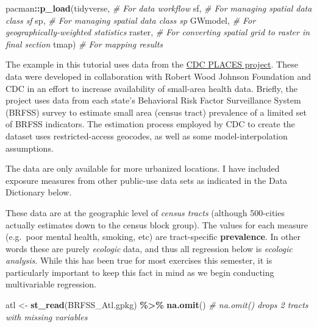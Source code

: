 \documentclass[
]{book}
\newenvironment{Shaded}{\begin{snugshade}}{\end{snugshade}}
\newcommand{\CommentTok}[1]{\textcolor[rgb]{0.56,0.35,0.01}{\textit{#1}}}
\newcommand{\FunctionTok}[1]{\textcolor[rgb]{0.13,0.29,0.53}{\textbf{#1}}}
\newcommand{\NormalTok}[1]{#1}
\newcommand{\OtherTok}[1]{\textcolor[rgb]{0.56,0.35,0.01}{#1}}
\newcommand{\SpecialCharTok}[1]{\textcolor[rgb]{0.81,0.36,0.00}{\textbf{#1}}}
\newcommand{\StringTok}[1]{\textcolor[rgb]{0.31,0.60,0.02}{#1}}
\begin{document}
\begin{Shaded}
\begin{Highlighting}[]
\NormalTok{pacman}\SpecialCharTok{::}\FunctionTok{p\_load}\NormalTok{(tidyverse,   }\CommentTok{\# For data workflow}
\NormalTok{               sf,          }\CommentTok{\# For managing spatial data class sf}
\NormalTok{               sp,          }\CommentTok{\# For managing spatial data class sp}
\NormalTok{               GWmodel,     }\CommentTok{\# For geographically{-}weighted statistics}
\NormalTok{               raster,      }\CommentTok{\# For converting spatial grid to raster in final section}
\NormalTok{               tmap)        }\CommentTok{\# For mapping results}
\end{Highlighting}
\end{Shaded}

The example in this tutorial uses data from the \href{https://www.cdc.gov/places/index.html}{CDC PLACES project}. These data were developed in collaboration with Robert Wood Johnson Foundation and CDC in an effort to increase availability of small-area health data. Briefly, the project uses data from each state's Behavioral Risk Factor Surveillance System (BRFSS) survey to estimate small area (census tract) prevalence of a limited set of BRFSS indicators. The estimation process employed by CDC to create the dataset uses restricted-access geocodes, as well as some model-interpolation assumptions.

The data are only available for more urbanized locations. I have included exposure measures from other public-use data sets as indicated in the Data Dictionary below.

These data are at the geographic level of \emph{census tracts} (although 500-cities actually estimates down to the census block group). The values for each measure (e.g.~poor mental health, smoking, etc) are tract-specific \textbf{prevalence}. In other words these are purely \emph{ecologic} data, and thus all regression below is \emph{ecologic analysis}. While this has been true for most exercises this semester, it is particularly important to keep this fact in mind as we begin conducting multivariable regression.

\begin{Shaded}
\begin{Highlighting}[]
\NormalTok{atl }\OtherTok{\textless{}{-}} \FunctionTok{st\_read}\NormalTok{(}\StringTok{\textquotesingle{}BRFSS\_Atl.gpkg\textquotesingle{}}\NormalTok{) }\SpecialCharTok{\%\textgreater{}\%}
  \FunctionTok{na.omit}\NormalTok{() }\CommentTok{\# na.omit() drops 2 tracts with missing variables}
\end{Highlighting}
\end{Shaded}
\end{document}
